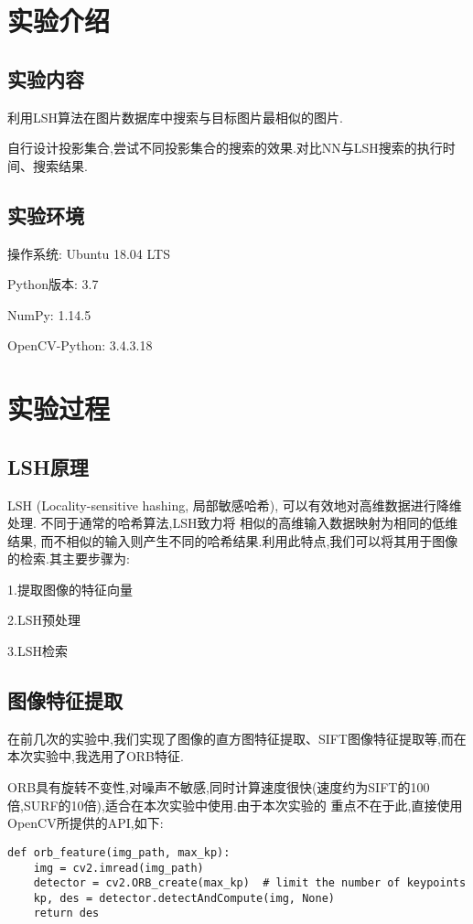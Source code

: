 \documentclass[a4paper]{article}
\begin{document}
    \begingroup
    \hypersetup{linkcolor=black}
    \tableofcontents
    \endgroup
    \newpage
    \section{实验介绍}
        \subsection{实验内容}
利用LSH算法在图片数据库中搜索与目标图片最相似的图片.

自行设计投影集合,尝试不同投影集合的搜索的效果.对比NN与LSH搜索的执行时间、搜索结果.

        \subsection{实验环境}
操作系统: Ubuntu 18.04 LTS

Python版本: 3.7

NumPy: 1.14.5

OpenCV-Python: 3.4.3.18
    \newpage
    \section{实验过程}
        \subsection{LSH原理}
LSH (Locality-sensitive hashing, 局部敏感哈希), 可以有效地对高维数据进行降维处理. 不同于通常的哈希算法,LSH致力将
相似的高维输入数据映射为相同的低维结果, 而不相似的输入则产生不同的哈希结果.利用此特点,我们可以将其用于图像的检索.其主要步骤为:

1.提取图像的特征向量

2.LSH预处理

3.LSH检索
        \subsection{图像特征提取}
在前几次的实验中,我们实现了图像的直方图特征提取、SIFT图像特征提取等,而在本次实验中,我选用了ORB特征.

ORB具有旋转不变性,对噪声不敏感,同时计算速度很快(速度约为SIFT的100倍,SURF的10倍),适合在本次实验中使用.由于本次实验的
重点不在于此,直接使用OpenCV所提供的API,如下:
\begin{verbatim}
def orb_feature(img_path, max_kp):
    img = cv2.imread(img_path)
    detector = cv2.ORB_create(max_kp)  # limit the number of keypoints
    kp, des = detector.detectAndCompute(img, None)
    return des
\end{verbatim}
\end{document}
